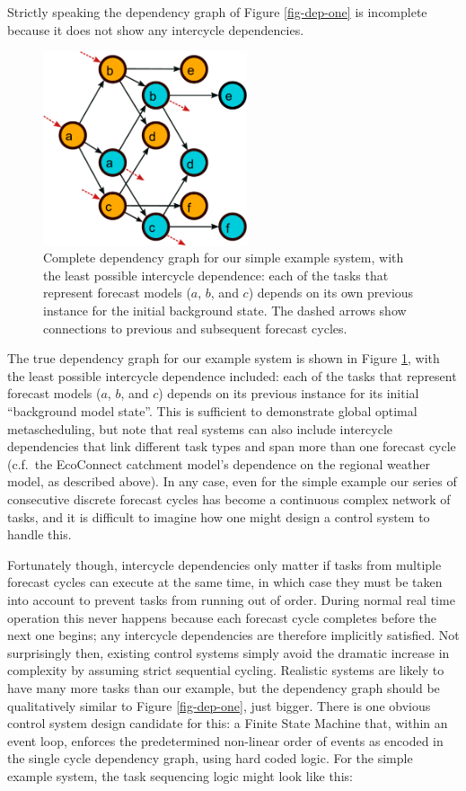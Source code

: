 \documentclass[11pt,a4paper]{article}
\begin{document}
Strictly speaking the dependency graph of Figure \ref{fig-dep-one} is
incomplete because it does not show any intercycle dependencies.
\begin{figure} \begin{center}
    \includegraphics[width=6cm]{dependencies-two} \end{center}
    \caption{\small Complete dependency graph for our simple example
    system, with the least possible intercycle dependence: each of the
    tasks that represent forecast models ($a$, $b$, and $c$) depends on
    its own previous instance for the initial background state. The
    dashed arrows show connections to previous and subsequent forecast
    cycles.} 
    \label{fig-dep-two}
\end{figure}
The true dependency graph for our example system is shown in Figure
\ref{fig-dep-two}, with the least possible intercycle dependence
included: each of the tasks that represent forecast models ($a$, $b$,
and $c$) depends on its previous instance for its initial ``background
model state''.  This is sufficient to demonstrate global
optimal metascheduling, but note that real systems can also include
intercycle dependencies that link different task types and span more
than one forecast cycle (c.f.\ the EcoConnect catchment model's
dependence on the regional weather model, as described above). 
In any case, even for the simple example our series of consecutive
discrete forecast cycles has become a continuous complex network of
tasks, and it is difficult to imagine how one might design a control
system to handle this. 

Fortunately though, intercycle dependencies only matter if tasks from
multiple forecast cycles can execute at the same time, in which case
they must be taken into account to prevent tasks from running out of
order. During normal real time operation this never happens because each
forecast cycle completes before the next one begins; any intercycle
dependencies are therefore implicitly satisfied.  Not surprisingly then,
existing control systems simply avoid the dramatic increase in
complexity by assuming strict sequential cycling.  Realistic systems are
likely to have many more tasks than our example, but the dependency
graph should be qualitatively similar to Figure \ref{fig-dep-one}, just
bigger.  There is one obvious control system design candidate for this:
a Finite State Machine that, within an event loop, enforces the
predetermined non-linear order of events as encoded in the single cycle
dependency graph, using hard coded logic.  For the simple example
system, the task sequencing logic might look like this:
\end{document}
